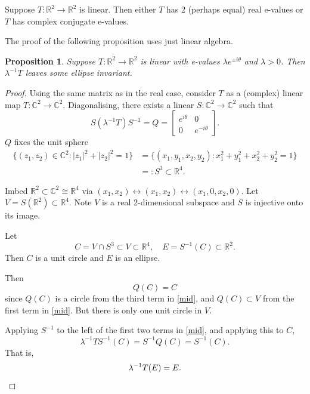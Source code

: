 \documentclass[a4paper]{amsart}
\theoremstyle{plain}
\newtheorem{proposition}[theorem]{Proposition}
\theoremstyle{definition}
\theoremstyle{remark}
\begin{document}
\title{}  
\author{John E.\ Hutchinson}
\date{\today}


\maketitle


Suppose $ T:\mathbb{R}^2 \to \mathbb{R}^2 $ is linear.  Then either $ T $ has 2 (perhaps equal) real e-values or $ T $ has complex conjugate e-values.

The proof of the following proposition uses just linear algebra.

\begin{proposition} Suppose $ T:\mathbb{R}^2 \to \mathbb{R}^2 $ is linear with e-values $ \lambda e^{\pm i\theta} $ and $ \lambda > 0 $. Then $ \lambda ^{-1} T $ leaves some ellipse invariant.
\end{proposition}

\begin{proof} Using the same matrix as in the real case,  consider $ T $ as a (complex) linear map $ T: \mathbb{C}^2 \to \mathbb{C} ^2 $.
Diagonalising, there exists a linear $ S: \mathbb{C}^2 \to \mathbb{C} ^2 $ such that
\begin{equation} \label{mid}
S (\lambda ^{-1} T) S^{-1} = Q = \begin{bmatrix} e^{  i\theta}& 0 \\ 0 & e^{ - i\theta} \end{bmatrix}.
\end{equation} 
 $ Q $ fixes the unit sphere 
\begin{align*}
  \{ (z_1,z_2 ) \in \mathbb{C} ^2 : |z_1|^2 + |z_2|^2 = 1 \} &= \{ (x_1,y_1,x_2,y_2) : x_1^2 + y_1^2 + x_2^2 + y_2^2 = 1 \}  \\
   & =:S^3 \subset \mathbb{R} ^4.
\end{align*} 
  
Imbed $ \mathbb{R} ^ 2 \subset \mathbb{C} ^2 \cong \mathbb{R} ^ 4 $ via $ (x_1,x_2) \leftrightarrow (x_1,x_2) \leftrightarrow (x_1,0,x_2,0) $.  Let $ V = S( \mathbb{R}^2) \subset \mathbb{R} ^4 $.  Note $ V $ is a real 2-dimensional subspace and $ S $ is injective onto its image.

Let 
\[
 C = V \cap S^3  \subset V  \subset \mathbb{R} ^ 4,  \quad E = S^{-1}(C) \subset \mathbb{R}^2 .
 \]
Then $ C $ is a unit circle and $ E $ is an ellipse.

Then  
\[
Q(C) = C 
\]
since $  Q(C) $ is a circle from the third term in \eqref{mid}, and $ Q(C)\subset V $ from the first term in \eqref{mid}.  But there is only one unit circle in $ V $.

Applying $ S^{-1} $ to the left of the first two terms in \eqref{mid}, and applying this to $ C $,
\[ 
\lambda ^{-1}T S^{-1}(C) = S^{-1}Q(C) = S^{-1} (C).
\] 
That is,
\[
\lambda ^{-1}T (E) = E. \qedhere
\] 
\end{proof} 


 
\end{document}
